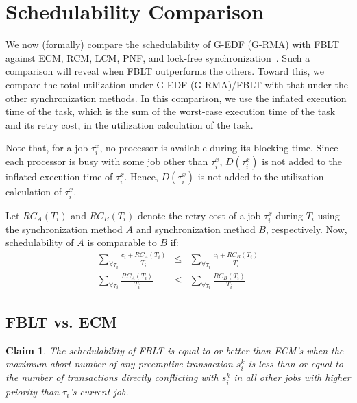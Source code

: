 \documentclass[a4paper,english]{article}
\newtheorem{clm}{Claim}
\begin{document}
\section{Schedulability Comparison}\label{schedulabiltiy comparison}

We now (formally) compare the schedulability of G-EDF (G-RMA) with FBLT against ECM, RCM, LCM, PNF, and lock-free synchronization~\cite{stmconcurrencycontrol:emsoft11,lcmdac2012,key-5,shambake_phd_proposal}. 
Such a comparison will reveal when FBLT outperforms the others. Toward this, we compare the total utilization under G-EDF (G-RMA)/FBLT with that under the other synchronization methods. In this comparison, we use the inflated execution time of the task, which is the sum of the worst-case execution time of the task and its retry cost, in the utilization calculation of the task.

Note that, for a job $\tau_i^x$, no processor is available during its blocking time. Since each processor is busy with some job other than $\tau_i^x$, $D(\tau_i^x)$ is not added to the inflated execution time of $\tau_i^x$. Hence, $D(\tau_i^x)$ is not added to the utilization calculation of $\tau_i^x$.

Let $RC_{A}(T_{i})$ and $RC_{B}(T_{i})$ denote the retry cost of a job $\tau_{i}^{x}$ during $T_{i}$ using the synchronization method $A$ and synchronization
method $B$, respectively. Now, schedulability of $A$ is comparable to $B$ if:
\begin{eqnarray}
\sum_{\forall\tau_{i}}\frac{c_{i}+RC_{A}(T_{i})}{T_{i}} & \le & \sum_{\forall\tau_{i}}\frac{c_{i}+RC_{B}(T_{i})}{T_{i}}\nonumber \\
\sum_{\forall\tau_{i}}\frac{RC_{A}(T_{i})}{T_{i}} & \le & \sum_{\forall\tau_{i}}\frac{RC_{B}(T_{i})}{T_{i}}\label{eq:utilization comparison}
\end{eqnarray}


\subsection{FBLT vs. ECM}

\begin{clm}\label{clm:fblt_ecm}
The schedulability of FBLT is equal to or better than ECM's when the maximum abort number of any preemptive transaction $s_i^k$ is less than or equal to the number of transactions directly conflicting with $s_i^k$ in all other jobs with higher priority than $\tau_{i}$'s current job. 
\end{clm}
\end{document}

